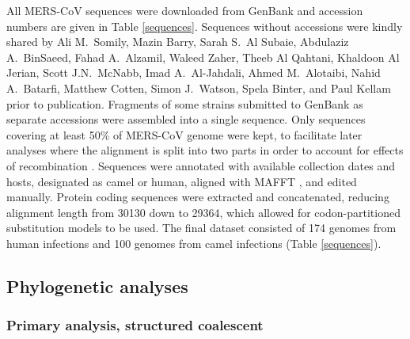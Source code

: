 \documentclass[9pt,lineno]{elife}
\begin{document}
All MERS-CoV sequences were downloaded from GenBank and accession numbers are given in Table \ref{sequences}.
Sequences without accessions were kindly shared by Ali M.\ Somily, Mazin Barry, Sarah S.\ Al Subaie, Abdulaziz A.\ BinSaeed, Fahad A.\ Alzamil, Waleed Zaher, Theeb Al Qahtani, Khaldoon Al Jerian, Scott J.N.\ McNabb, Imad A.\ Al-Jahdali, Ahmed M.\ Alotaibi, Nahid A.\ Batarfi, Matthew Cotten, Simon J.\ Watson, Spela Binter, and Paul Kellam prior to publication.
Fragments of some strains submitted to GenBank as separate accessions were assembled into a single sequence.
Only sequences covering at least 50\% of MERS-CoV genome were kept, to facilitate later analyses where the alignment is split into two parts in order to account for effects of recombination \citep{dudas_mers-cov_2016}.
Sequences were annotated with available collection dates and hosts, designated as camel or human, aligned with MAFFT \citep{katoh_mafft_2013}, and edited manually.
Protein coding sequences were extracted and concatenated, reducing alignment length from 30130 down to 29364, which allowed for codon-partitioned substitution models to be used.
The final dataset consisted of 174 genomes from human infections and 100 genomes from camel infections (Table \ref{sequences}).

\subsection*{Phylogenetic analyses}

\subsubsection*{Primary analysis, structured coalescent}
\end{document}
